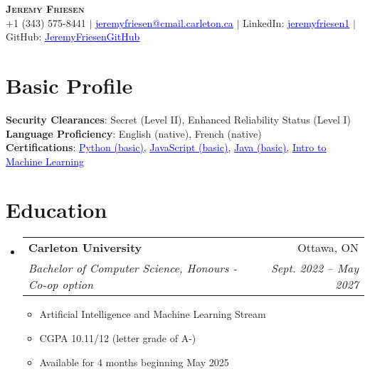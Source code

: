 \documentclass[letterpaper,11pt]{article}
\makeatletter
\newcommand{\resumeItem}[1]{
  \item\small{
    {#1 \vspace{-2pt}}
  }
}
\newcommand{\resumeSubheading}[4]{
  \vspace{-2pt}\item
    \begin{tabular*}{0.97\textwidth}[t]{l@{\extracolsep{\fill}}r}
      \textbf{#1} & #2 \\
      \textit{\small#3} & \textit{\small #4} \\
    \end{tabular*}\vspace{-7pt}
}
\newcommand{\resumeSubHeadingListStart}{\begin{itemize}[leftmargin=0.15in, label={}]}
\newcommand{\resumeSubHeadingListEnd}{\end{itemize}}
\newcommand{\resumeItemListStart}{\begin{itemize}}
\newcommand{\resumeItemListEnd}{\end{itemize}\vspace{-5pt}}
\makeatother
\begin{document}

\begin{center}
    \textbf{\Huge \scshape Jeremy Friesen} \\ \vspace{5pt}
    \small +1 (343) 575-8441 $|$ 
    \href{mailto:jeremyfriesen@cmail.carleton.ca}{\textcolor{blue}{\underline{jeremyfriesen@cmail.carleton.ca}}} $|$ 
    LinkedIn: \href{https://linkedin.com/in/jeremyfriesen1}{\textcolor{blue}{\underline{jeremyfriesen1}}} $|$ 
    GitHub: \href{https://github.com/JeremyFriesenGitHub}{\textcolor{blue}{\underline{JeremyFriesenGitHub}}}
\end{center}


\section{Basic Profile}
 \begin{itemize}[leftmargin=0.15in, label={}]
    \small{\item{
    \textbf{Security Clearances}{: Secret (Level II), Enhanced Reliability Status (Level I)} \\
     \textbf{Language Proficiency}{: English (native), French (native)}  \\
     
     \textbf{Certifications}{: \href{https://www.hackerrank.com/certificates/4a8e6ae17626}{\textcolor{blue}{\underline{Python (basic)}}}, 
     \href{https://www.hackerrank.com/certificates/b4b9cb2f4e4a}{\textcolor{blue}{\underline{JavaScript (basic)}}}, 
     \href{https://www.hackerrank.com/certificates/fbcafb873c96}{\textcolor{blue}{\underline{Java (basic)}}}, 
     \href{https://www.kaggle.com/learn/certification/jeremyfriesen123/intro-to-machine-learning}{\textcolor{blue}{\underline{Intro to Machine Learning}}}
     }      
    }}
 \end{itemize}



\section{Education}
  \resumeSubHeadingListStart
    \resumeSubheading
      {Carleton University}{Ottawa, ON}
      {Bachelor of Computer Science, Honours - Co-op option}{Sept. 2022  -- May 2027}
    \resumeItemListStart
        \resumeItem{Artificial Intelligence and Machine Learning Stream}
        \resumeItem{CGPA 10.11/12 (letter grade of A-)}
        \resumeItem{Available for 4 months beginning May 2025}
    \resumeItemListEnd
  \resumeSubHeadingListEnd
\end{document}
